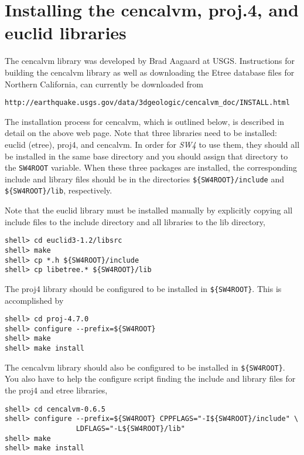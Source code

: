 \documentclass[11pt]{article}
\begin{document}
\section{Installing the cencalvm, proj.4, and euclid libraries}\label{sec:cencalvm-install}

The cencalvm library was developed by Brad Aagaard at USGS. Instructions for building the cencalvm
library as well as downloading the Etree database files for Northern California, can
currently be downloaded from
\begin{verbatim}
http://earthquake.usgs.gov/data/3dgeologic/cencalvm_doc/INSTALL.html
\end{verbatim}
The installation process for cencalvm, which is outlined below, is described in detail on the above
web page.  Note that three libraries need to be installed: euclid (etree), proj4, and cencalvm.  In
order for \emph{SW4} to use them, they should all be installed in the same base directory and you
should assign that directory to the \verb+SW4ROOT+ variable. When these three packages are installed, the
corresponding include and library files should be in the directories \verb+${SW4ROOT}/include+ and
\verb+${SW4ROOT}/lib+, respectively.

Note that the euclid library must be installed manually by explicitly copying all include files to
the include directory and all libraries to the lib directory,
\begin{verbatim}
shell> cd euclid3-1.2/libsrc
shell> make
shell> cp *.h ${SW4ROOT}/include
shell> cp libetree.* ${SW4ROOT}/lib
\end{verbatim}
The proj4 library should be configured to be installed in \verb+${SW4ROOT}+. This is accomplished by
\begin{verbatim}
shell> cd proj-4.7.0
shell> configure --prefix=${SW4ROOT}
shell> make
shell> make install
\end{verbatim}
The cencalvm library should also be configured to be installed in \verb+${SW4ROOT}+. You also have to help
the configure script finding the include and library files for the proj4 and etree libraries,
\begin{verbatim}
shell> cd cencalvm-0.6.5
shell> configure --prefix=${SW4ROOT} CPPFLAGS="-I${SW4ROOT}/include" \
                 LDFLAGS="-L${SW4ROOT}/lib"
shell> make
shell> make install
\end{verbatim}
\end{document}
